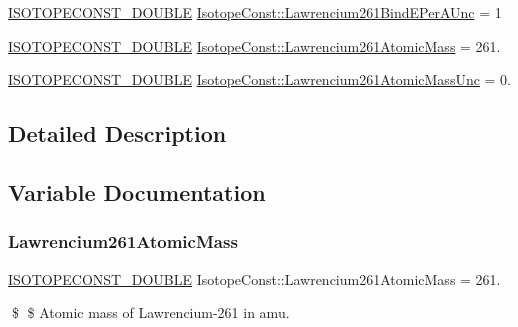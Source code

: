 \begin{DoxyCompactItemize}
\mbox{\hyperlink{group___isotope_const-_macros_ga8f45a7272ce02c0b4c65c44636ed719a}{I\+S\+O\+T\+O\+P\+E\+C\+O\+N\+S\+T\+\_\+\+D\+O\+U\+B\+LE}} \mbox{\hyperlink{group___isotope_const-_lawrencium-_lr261_gab4b121b40181c3978c13e000ed99eee9}{Isotope\+Const\+::\+Lawrencium261\+Bind\+E\+Per\+A\+Unc}} = 1
\item 
\mbox{\hyperlink{group___isotope_const-_macros_ga8f45a7272ce02c0b4c65c44636ed719a}{I\+S\+O\+T\+O\+P\+E\+C\+O\+N\+S\+T\+\_\+\+D\+O\+U\+B\+LE}} \mbox{\hyperlink{group___isotope_const-_lawrencium-_lr261_ga4103f7b89e48838d70b900ef2cb8c421}{Isotope\+Const\+::\+Lawrencium261\+Atomic\+Mass}} = 261.
\item 
\mbox{\hyperlink{group___isotope_const-_macros_ga8f45a7272ce02c0b4c65c44636ed719a}{I\+S\+O\+T\+O\+P\+E\+C\+O\+N\+S\+T\+\_\+\+D\+O\+U\+B\+LE}} \mbox{\hyperlink{group___isotope_const-_lawrencium-_lr261_gaa03722983c95be48240fa31849ca0892}{Isotope\+Const\+::\+Lawrencium261\+Atomic\+Mass\+Unc}} = 0.
\end{DoxyCompactItemize}


\subsection{Detailed Description}


\subsection{Variable Documentation}
\mbox{\label{group___isotope_const-_lawrencium-_lr261_ga4103f7b89e48838d70b900ef2cb8c421}} 
\subsubsection{\texorpdfstring{Lawrencium261\+Atomic\+Mass}{Lawrencium261AtomicMass}}
{\footnotesize\ttfamily \mbox{\hyperlink{group___isotope_const-_macros_ga8f45a7272ce02c0b4c65c44636ed719a}{I\+S\+O\+T\+O\+P\+E\+C\+O\+N\+S\+T\+\_\+\+D\+O\+U\+B\+LE}} Isotope\+Const\+::\+Lawrencium261\+Atomic\+Mass = 261.}

\$ \$ Atomic mass of Lawrencium-\/261 in amu. \mbox{\label{group___isotope_const-_lawrencium-_lr261_gaa03722983c95be48240fa31849ca0892}} 
